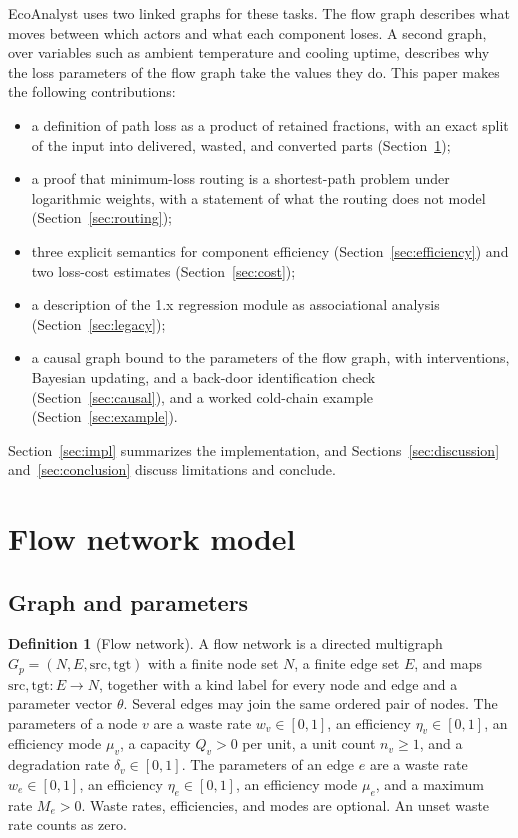 \documentclass[12pt]{article}
\theoremstyle{plain}
\theoremstyle{definition}
\newtheorem{definition}{Definition}
\begin{document}
EcoAnalyst uses two linked graphs for these tasks. The flow graph describes what moves between which actors and what each component loses. A second graph, over variables such as ambient temperature and cooling uptime, describes why the loss parameters of the flow graph take the values they do. This paper makes the following contributions:
\begin{itemize}
    \item a definition of path loss as a product of retained fractions, with an exact split of the input into delivered, wasted, and converted parts (Section~\ref{sec:flow});
    \item a proof that minimum-loss routing is a shortest-path problem under logarithmic weights, with a statement of what the routing does not model (Section~\ref{sec:routing});
    \item three explicit semantics for component efficiency (Section~\ref{sec:efficiency}) and two loss-cost estimates (Section~\ref{sec:cost});
    \item a description of the 1.x regression module as associational analysis (Section~\ref{sec:legacy});
    \item a causal graph bound to the parameters of the flow graph, with interventions, Bayesian updating, and a back-door identification check (Section~\ref{sec:causal}), and a worked cold-chain example (Section~\ref{sec:example}).
\end{itemize}
Section~\ref{sec:impl} summarizes the implementation, and Sections~\ref{sec:discussion} and~\ref{sec:conclusion} discuss limitations and conclude.

\section{Flow network model}\label{sec:flow}

\subsection{Graph and parameters}

\begin{definition}[Flow network]\label{def:flow}
A flow network is a directed multigraph $G_p=(N,E,\mathrm{src},\mathrm{tgt})$ with a finite node set $N$, a finite edge set $E$, and maps $\mathrm{src},\mathrm{tgt}:E\to N$, together with a kind label for every node and edge and a parameter vector $\theta$. Several edges may join the same ordered pair of nodes. The parameters of a node $v$ are a waste rate $w_v\in[0,1]$, an efficiency $\eta_v\in[0,1]$, an efficiency mode $\mu_v$, a capacity $Q_v>0$ per unit, a unit count $n_v\geq 1$, and a degradation rate $\delta_v\in[0,1]$. The parameters of an edge $e$ are a waste rate $w_e\in[0,1]$, an efficiency $\eta_e\in[0,1]$, an efficiency mode $\mu_e$, and a maximum rate $M_e>0$. Waste rates, efficiencies, and modes are optional. An unset waste rate counts as zero.
\end{definition}
\end{document}
